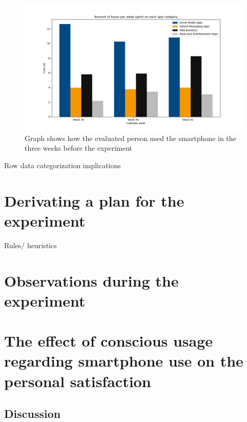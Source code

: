 \documentclass[11pt,letterpaper]{article}
\begin{document}
\begin{figure}[h]
\centering
\includegraphics[width = \textwidth]{../data/usage-times.png}
\caption{Graph shows how the evaluated person used the smartphone in the three weeks before the experiment}
\end{figure}


Row data
categorization
implications

\section*{Derivating a plan for the experiment}
Rules/ heuristics

\section*{Observations during the experiment}

\section*{The effect of conscious usage regarding smartphone use on the personal satisfaction}

\subsection*{Discussion}

\newpage





\printbibliography 
\end{document}
